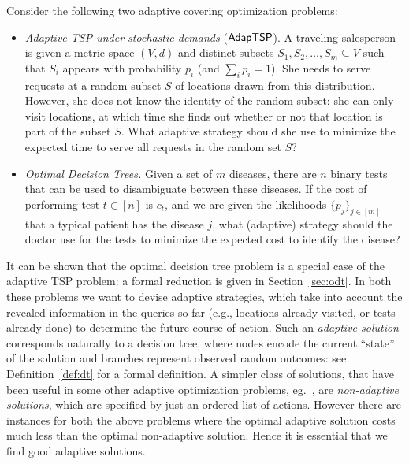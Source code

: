 \documentclass[11pt]{article}
\def\sse{\subseteq}
\def\stsp{\ensuremath{{\sf AdapTSP}}\xspace}
\def\dtp{optimal decision tree problem\xspace}
\begin{document}
Consider the following two adaptive covering optimization problems:
\begin{itemize}

\item \emph{Adaptive TSP under stochastic demands} (\stsp). A traveling  salesperson is given a metric space $(V,d)$ and distinct subsets $S_1,
  S_2, \ldots, S_m \sse V$ such that $S_i$ appears with probability  $p_i$ (and $\sum_i p_i = 1$). She needs to serve requests at a random
subset $S$ of locations drawn from this distribution. However, she does not know the identity of the
  random subset: she can only visit locations, at which time she finds
  out whether or not that location is part of the subset $S$. What adaptive
  strategy should she use to minimize the expected time to serve all
  requests in the random  set $S$?

\item \emph{Optimal Decision Trees.} Given a set of $m$ diseases, there
  are $n$ binary tests that can be used to disambiguate between these
  diseases.  If the cost of performing test $t \in [n]$ is $c_t$,
  and we are given the likelihoods $\{p_j\}_{j \in [m]}$ that a typical
  patient has the disease $j$, what (adaptive) strategy should the
  doctor use for the tests to minimize the expected cost to identify the
  disease?   
  \end{itemize}

It can be shown that the \dtp is a special case of the adaptive TSP problem: a formal reduction is given in
Section~\ref{sec:odt}.  In both these problems we want to devise adaptive strategies, which take into account
the revealed information in the queries so far (e.g., locations already visited, or tests already done) to determine
the future course of action. Such an {\em adaptive solution} corresponds naturally to a decision tree, where nodes encode the current ``state'' of the solution and branches represent observed random outcomes: see Definition~\ref{def:dt} for a formal definition.  A simpler class of solutions, that have been useful in some other adaptive optimization problems, eg.~\cite{DGV08,GuhaM09,BGLMNR12}, are {\em non-adaptive solutions}, which are specified by just an ordered list of actions. However there are instances for both the above problems where the optimal adaptive solution costs much less than the optimal non-adaptive solution.  
Hence it is
essential that we find good  adaptive solutions.
\end{document}
